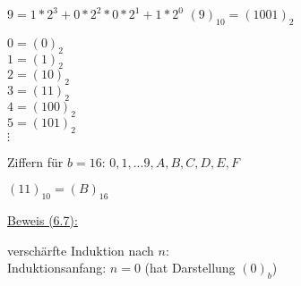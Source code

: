 \documentclass[a4paper, 12pt, twoside] {article}
\begin{document}
$9 = 1*2^3 + 0*2^2 * 0*2^1 + 1*2^0$
$(9)_{10} = (1001)_2$

$0 = (0)_2$ \\
$1 = (1)_2$ \\
$2 = (10)_2$ \\
$3 = (11)_2$ \\
$4 = (100)_2$ \\
$5 = (101)_2$ \\
$\vdots$

Ziffern für $b=16$:
$0, 1, ...9, A, B, C, D, E, F$

$(11)_{10} = (B)_{16}$

\underline{Beweis (6.7):}

verschärfte Induktion nach $n$: \\
Induktionsanfang: $n = 0$ (hat Darstellung $(0)_b$)
\end{document}
